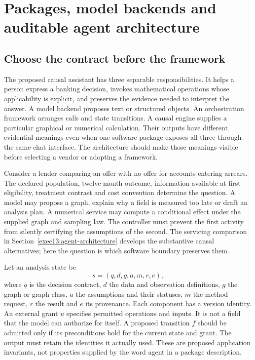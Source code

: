 \chapter{Packages, model backends and auditable agent architecture}
\label{exec14:l6}
\label{ch:la05-prototype}

\section{Choose the contract before the framework}

The proposed causal assistant has three separable responsibilities. It helps
a person express a banking decision, invokes mathematical operations whose
applicability is explicit, and preserves the evidence needed to interpret the
answer. A model backend proposes text or structured objects. An orchestration
framework arranges calls and state transitions. A causal engine supplies a
particular graphical or numerical calculation. Their outputs have different
evidential meanings even when one software package exposes all three through
the same chat interface. The architecture should make those meanings visible
before selecting a vendor or adopting a framework.

Consider a lender comparing an offer with no offer for accounts entering
arrears. The declared population, twelve-month outcome, information available
at first eligibility, treatment contrast and cost convention determine the
question. A model may propose a graph, explain why a field is measured too
late or draft an analysis plan. A numerical service may compute a conditional
effect under the supplied graph and sampling law. The controller must prevent
the first activity from silently certifying the assumptions of the second.
The servicing comparison in Section~\ref{exec13:agent-architecture} develops
the substantive causal alternatives; here the question is which software
boundary preserves them.

Let an analysis state be
\begin{equation}
 s=(q,d,g,a,m,r,e),
 \label{exec14:l6-state}
\end{equation}
where $q$ is the decision contract, $d$ the data and observation definitions,
$g$ the graph or graph class, $a$ the assumptions and their statuses, $m$ the
method request, $r$ the result and $e$ its provenance. Each component has a
version identity. An external grant $u$ specifies permitted operations and
inputs. It is not a field that the model can authorize for itself. A proposed
transition $f$ should be admitted only if its preconditions hold for the
current state and grant. The output must retain the identities it actually
used. These are proposed application invariants, not properties supplied by
the word agent in a package description.\cite{exec14_l6_design}

